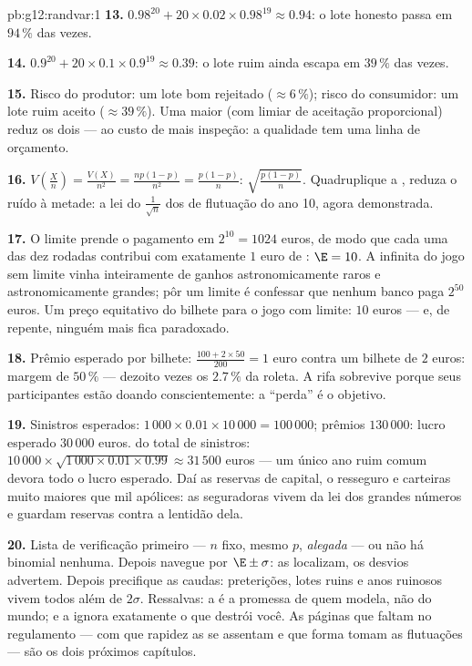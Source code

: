 \begin{solution}{pb:g12:randvar:1}
\textbf{13.} $0.98^{20} + 20 \times 0.02 \times 0.98^{19}
\approx 0.94$: o lote honesto passa em $94\,\%$ das vezes.

\textbf{14.} $0.9^{20} + 20 \times 0.1 \times 0.9^{19}
\approx 0.39$: o lote ruim ainda escapa em $39\,\%$ das vezes.

\textbf{15.} Risco do produtor: um lote bom rejeitado
($\approx 6\,\%$); risco do consumidor: um lote ruim aceito
($\approx 39\,\%$). Uma  maior (com limiar de aceitação
proporcional) reduz os dois --- ao custo de mais inspeção: a
qualidade tem uma linha de orçamento.

\textbf{16.} $V\!\left(\frac Xn\right) = \frac{V(X)}{n^2} =
\frac{np(1-p)}{n^2} = \frac{p(1-p)}{n}$: 
$\sqrt{\frac{p(1-p)}{n}}$. Quadruplique a , reduza o
ruído à metade: a lei do $\frac{1}{\sqrt n}$ dos  de
flutuação do ano 10, agora demonstrada.

\textbf{17.} O limite prende o pagamento em $2^{10} = 1024$
euros, de modo que cada uma das dez rodadas contribui com
exatamente $1$ euro de : $\E = 10$. A 
infinita do jogo sem limite vinha inteiramente de ganhos
astronomicamente raros e astronomicamente grandes; pôr um
limite é confessar que nenhum banco paga $2^{50}$ euros. Um
preço equitativo do bilhete para o jogo com limite: $10$ euros
--- e, de repente, ninguém mais fica paradoxado.

\textbf{18.} Prêmio esperado por bilhete:
$\frac{100 + 2 \times 50}{200} = 1$ euro contra um bilhete de
$2$ euros: margem de $50\,\%$ --- dezoito vezes os $2.7\,\%$
da roleta. A rifa sobrevive porque seus participantes estão
doando conscientemente: a ``perda'' é o objetivo.

\textbf{19.} Sinistros esperados: $1\,000 \times 0.01 \times
10\,000 = 100\,000$; prêmios $130\,000$: lucro esperado
$30\,000$ euros.  do total de sinistros:
$10\,000 \times \sqrt{1\,000 \times 0.01 \times 0.99}
\approx 31\,500$ euros --- um único ano ruim comum devora todo
o lucro esperado. Daí as reservas de capital, o resseguro e
carteiras muito maiores que mil apólices: as seguradoras vivem
da lei dos grandes números e guardam reservas contra a lentidão
dela.

\textbf{20.} Lista de verificação primeiro --- $n$ fixo, mesmo
$p$,  \emph{alegada} --- ou não há binomial
nenhuma. Depois navegue por $\E \pm \sigma$: as 
localizam, os desvios advertem. Depois precifique as caudas:
preterições, lotes ruins e anos ruinosos vivem todos além de
$2\sigma$. Ressalvas: a  é a promessa de quem
modela, não do mundo; e a  ignora exatamente o que
destrói você. As páginas que faltam no regulamento --- com que
rapidez as  se assentam e que forma tomam as
flutuações --- são os dois próximos capítulos.
\end{solution}
